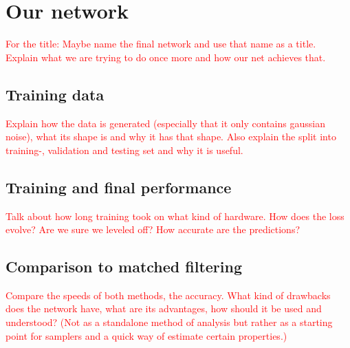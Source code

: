 \section{Our network}
\textcolor{red}{For the title: Maybe name the final network and use that name as a title.\\Explain what we are trying to do once more and how our net achieves that.}
\subsection{Training data}
\textcolor{red}{Explain how the data is generated (especially that it only contains gaussian noise), what its shape is and why it has that shape. Also explain the split into training-, validation and testing set and why it is useful.}
\subsection{Training and final performance}
\textcolor{red}{Talk about how long training took on what kind of hardware. How does the loss evolve? Are we sure we leveled off? How accurate are the predictions?}
\subsection{Comparison to matched filtering}
\textcolor{red}{Compare the speeds of both methods, the accuracy. What kind of drawbacks does the network have, what are its advantages, how should it be used and understood? (Not as a standalone method of analysis but rather as a starting point for samplers and a quick way of estimate certain properties.)}
